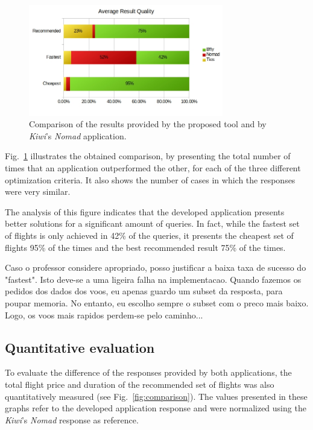 \begin{figure}[!b]
    \centering
    \includegraphics[width=8.5cm]{./imgs/average_result_quality.jpg}
    \caption{Comparison of the results provided by the proposed tool and by \textit{Kiwi}'s \textit{Nomad} application.}
    \label{fig:quality_apis}
\end{figure}

Fig.~\ref{fig:quality_apis} illustrates the obtained comparison, by presenting the total number of times that an application outperformed the other, for each of the three different optimization criteria. It also shows the number of cases in which the responses were very similar.

The analysis of this figure indicates that the developed application presents better solutions for a significant amount of queries. In fact, while the fastest set of flights is only achieved in 42\% of the queries, it presents the cheapest set of flights 95\% of the times and the best recommended result 75\% of the times. 

Caso o professor considere apropriado, posso justificar a baixa taxa de sucesso do "fastest". Isto deve-se a uma ligeira falha na implementacao. Quando fazemos os pedidos dos dados dos voos, eu apenas guardo um subset da resposta, para poupar memoria. No entanto, eu escolho sempre o subset com o preco mais baixo. Logo, os voos mais rapidos perdem-se pelo caminho...


\subsection{Quantitative evaluation}
\label{sec:quantitative_eval}

To evaluate the difference of the responses provided by both applications, the total flight price and duration of the recommended set of flights was also quantitatively measured (see Fig.~\ref{fig:comparison}). The values presented in these graphs refer to the developed application response and were normalized using the \textit{Kiwi}'s \textit{Nomad} response as reference. 


